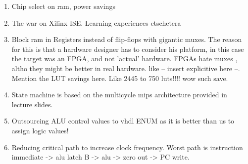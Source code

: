 \begin{enumerate}
  \item
    Chip select on ram, power savings

  \item
    The war on Xilinx ISE. Learning experiences etschetera

  \item
    Block ram in Registers instead of flip-flops with gigantic muxes. The reason for this is that a hardware designer has to consider his platform, in this case the target was an FPGA, and not 'actual' hardware. FPGAs hate muxes , altho they might be better in real hardware. like -- insert explicitive here --. Mention the LUT savings here. Like 2445 to 750 luts!!!! wow such save.

  \item
    State machine is based on the multicycle mips architecture provided in lecture slides.

  \item
    Outsourcing ALU control values to vhdl ENUM as it is better than us to assign logic values!

  \item
    Reducing critical path to increase clock frequency. Worst path is instruction immediate -> alu latch B -> alu -> zero out -> PC write.


\end{enumerate}
